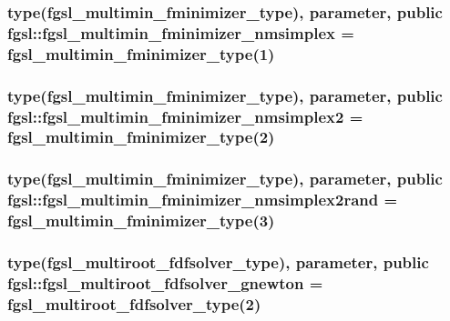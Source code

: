 \hypertarget{classfgsl_ab2e841755e0db0b740c913a9ca231417}{
\subsubsection[{fgsl\-\_\-multimin\-\_\-fminimizer\-\_\-nmsimplex}]{\setlength{\rightskip}{0pt plus 5cm}type({\bf fgsl\-\_\-multimin\-\_\-fminimizer\-\_\-type}), parameter, public fgsl\-::fgsl\-\_\-multimin\-\_\-fminimizer\-\_\-nmsimplex = {\bf fgsl\-\_\-multimin\-\_\-fminimizer\-\_\-type}(1)}}\label{classfgsl_ab2e841755e0db0b740c913a9ca231417}
\hypertarget{classfgsl_a360e9e8ff70d499aedd5dbbdbdfd8404}{
\subsubsection[{fgsl\-\_\-multimin\-\_\-fminimizer\-\_\-nmsimplex2}]{\setlength{\rightskip}{0pt plus 5cm}type({\bf fgsl\-\_\-multimin\-\_\-fminimizer\-\_\-type}), parameter, public fgsl\-::fgsl\-\_\-multimin\-\_\-fminimizer\-\_\-nmsimplex2 = {\bf fgsl\-\_\-multimin\-\_\-fminimizer\-\_\-type}(2)}}\label{classfgsl_a360e9e8ff70d499aedd5dbbdbdfd8404}
\hypertarget{classfgsl_a1d64d873582c83a3e43c44d10ada296e}{
\subsubsection[{fgsl\-\_\-multimin\-\_\-fminimizer\-\_\-nmsimplex2rand}]{\setlength{\rightskip}{0pt plus 5cm}type({\bf fgsl\-\_\-multimin\-\_\-fminimizer\-\_\-type}), parameter, public fgsl\-::fgsl\-\_\-multimin\-\_\-fminimizer\-\_\-nmsimplex2rand = {\bf fgsl\-\_\-multimin\-\_\-fminimizer\-\_\-type}(3)}}\label{classfgsl_a1d64d873582c83a3e43c44d10ada296e}
\hypertarget{classfgsl_a4ecb43f393dacc9cefa731f8aec97f40}{
\subsubsection[{fgsl\-\_\-multiroot\-\_\-fdfsolver\-\_\-gnewton}]{\setlength{\rightskip}{0pt plus 5cm}type({\bf fgsl\-\_\-multiroot\-\_\-fdfsolver\-\_\-type}), parameter, public fgsl\-::fgsl\-\_\-multiroot\-\_\-fdfsolver\-\_\-gnewton = {\bf fgsl\-\_\-multiroot\-\_\-fdfsolver\-\_\-type}(2)}}\label{classfgsl_a4ecb43f393dacc9cefa731f8aec97f40}
